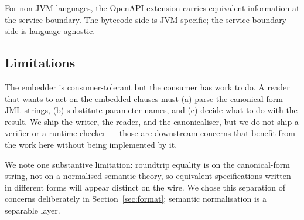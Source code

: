 For non-JVM languages, the OpenAPI extension carries equivalent information at the service boundary. The bytecode side is JVM-specific; the service-boundary side is language-agnostic.

\subsection{Limitations}

The embedder is consumer-tolerant but the consumer has work to do. A reader that wants to act on the embedded clauses must (a) parse the canonical-form JML strings, (b) substitute parameter names, and (c) decide what to do with the result. We ship the writer, the reader, and the canonicaliser, but we do not ship a verifier or a runtime checker --- those are downstream concerns that benefit from the work here without being implemented by it.

We note one substantive limitation: roundtrip equality is on the canonical-form string, not on a normalised semantic theory, so equivalent specifications written in different forms will appear distinct on the wire. We chose this separation of concerns deliberately in Section~\ref{sec:format}; semantic normalisation is a separable layer.
